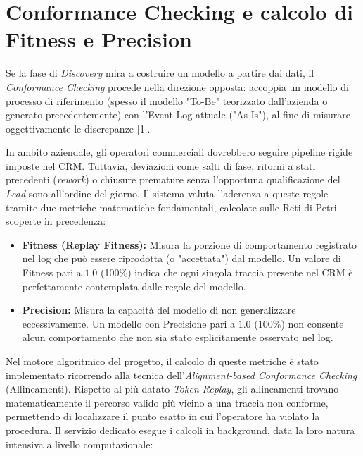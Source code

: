 \documentclass[12pt, a4paper]{report}
\begin{document}
\section{Conformance Checking e calcolo di Fitness e Precision}
Se la fase di \textit{Discovery} mira a costruire un modello a partire dai dati, il \textit{Conformance Checking} procede nella direzione opposta: accoppia un modello di processo di riferimento (spesso il modello "To-Be" teorizzato dall'azienda o generato precedentemente) con l'Event Log attuale ("As-Is"), al fine di misurare oggettivamente le discrepanze [1].

In ambito aziendale, gli operatori commerciali dovrebbero seguire pipeline rigide imposte nel CRM. Tuttavia, deviazioni come salti di fase, ritorni a stati precedenti (\textit{rework}) o chiusure premature senza l'opportuna qualificazione del \textit{Lead} sono all'ordine del giorno. Il sistema valuta l'aderenza a queste regole tramite due metriche matematiche fondamentali, calcolate sulle Reti di Petri scoperte in precedenza:

\begin{itemize}
    \item \textbf{Fitness (Replay Fitness):} Misura la porzione di comportamento registrato nel log che può essere riprodotta (o "accettata") dal modello. Un valore di Fitness pari a $1.0$ (100\%) indica che ogni singola traccia presente nel CRM è perfettamente contemplata dalle regole del modello.
    \item \textbf{Precision:} Misura la capacità del modello di non generalizzare eccessivamente. Un modello con Precisione pari a $1.0$ (100\%) non consente alcun comportamento che non sia stato esplicitamente osservato nel log.
\end{itemize}

Nel motore algoritmico del progetto, il calcolo di queste metriche è stato implementato ricorrendo alla tecnica dell'\textit{Alignment-based Conformance Checking} (Allineamenti). Rispetto al più datato \textit{Token Replay}, gli allineamenti trovano matematicamente il percorso valido più vicino a una traccia non conforme, permettendo di localizzare il punto esatto in cui l'operatore ha violato la procedura. Il servizio dedicato esegue i calcoli in background, data la loro natura intensiva a livello computazionale:
\end{document}
